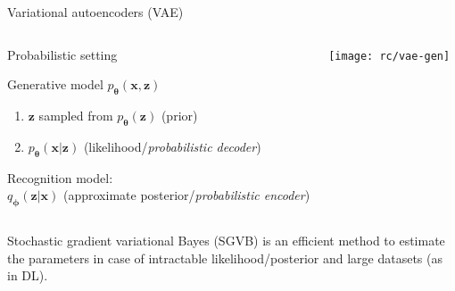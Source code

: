 \documentclass{beamer}
\begin{document}
  \begin{frame}{Variational autoencoders (VAE)}
    
    \begin{columns}[T,onlytextwidth]

      \begin{block}{Probabilistic setting}
        \small{
        Generative model $p_{\boldsymbol{\theta}}(\mathbf{x}, \mathbf{z})$
        \begin{enumerate}
          \item $\mathbf{z}$ sampled from $p_{\boldsymbol{\theta}}(\mathbf{z})$ (prior)
          \item $p_{\boldsymbol{\theta}}(\mathbf{x}|\mathbf{z})$ (likelihood/\emph{probabilistic decoder})
        \end{enumerate}
        Recognition model:\\
        $q_{\boldsymbol{\phi}}(\mathbf{z}|\mathbf{x})$ (approximate posterior/\emph{probabilistic encoder})
        }
      \end{block}

      \texttt{[image: rc/vae-gen]}
      
    \end{columns}
    
    Stochastic gradient variational Bayes (SGVB) \cite{Kingma2014} is an efficient method to estimate the parameters in case of intractable likelihood/posterior and large datasets (as in DL).


  \end{frame}
\end{document}
